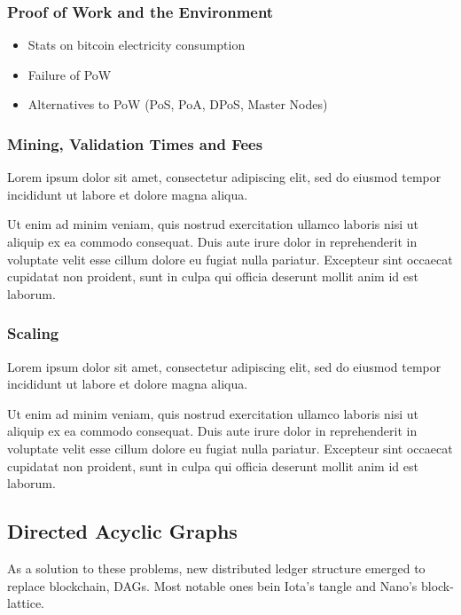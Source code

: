 \documentclass[a4paper]{article}
\begin{document}
\subsubsection{Proof of Work and the Environment}

\begin{itemize}
\item Stats on bitcoin electricity consumption
\item Failure of PoW
\item Alternatives to PoW (PoS, PoA, DPoS, Master Nodes)
\end{itemize}

\subsubsection{Mining, Validation Times and Fees}

Lorem ipsum dolor sit amet, consectetur adipiscing elit, sed do eiusmod tempor incididunt ut labore et dolore magna aliqua.

Ut enim ad minim veniam, quis nostrud exercitation ullamco laboris nisi ut aliquip ex ea commodo consequat. Duis aute irure dolor in reprehenderit in voluptate velit esse cillum dolore eu fugiat nulla pariatur. Excepteur sint occaecat cupidatat non proident, sunt in culpa qui officia deserunt mollit anim id est laborum.

\subsubsection{Scaling}

Lorem ipsum dolor sit amet, consectetur adipiscing elit, sed do eiusmod tempor incididunt ut labore et dolore magna aliqua.

Ut enim ad minim veniam, quis nostrud exercitation ullamco laboris nisi ut aliquip ex ea commodo consequat. Duis aute irure dolor in reprehenderit in voluptate velit esse cillum dolore eu fugiat nulla pariatur. Excepteur sint occaecat cupidatat non proident, sunt in culpa qui officia deserunt mollit anim id est laborum.

\subsection{Directed Acyclic Graphs}

As a solution to these problems, new distributed ledger structure emerged to replace blockchain, DAGs. Most notable ones bein Iota's tangle and Nano's block-lattice. 
\end{document}
